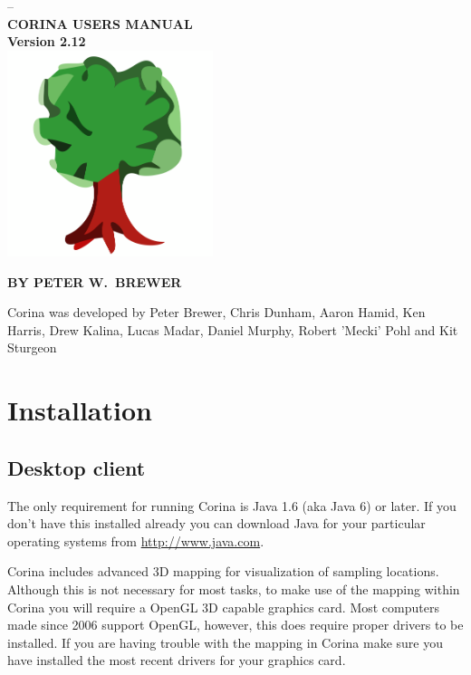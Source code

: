 \documentclass[10pt,letter, twopage headsepline]{book}
\begin{document}
\begin{titlepage}
{\centering --\\[4cm] \Huge \bfseries CORINA USERS MANUAL
\\[0.5cm]
\large{Version 2.12}
\\[2cm]
\includegraphics[width=6cm]{Images/logo.png}\\[1cm]
}

{\centering 
\normalsize
\textbf{BY PETER W.\ BREWER}\\[0.6cm]
}

\vfill

{\footnotesize
Corina was developed by Peter Brewer, Chris Dunham, Aaron Hamid, Ken Harris, Drew Kalina, Lucas Madar, Daniel Murphy, Robert 'Mecki' Pohl and Kit Sturgeon
}

\end{titlepage}
\tableofcontents

\chapter{Installation}


\section{Desktop client}



The only requirement for running Corina is Java 1.6 (aka Java 6) or later. If you don't have this installed already you can download Java for your particular operating systems from \url{http://www.java.com}.

Corina includes advanced 3D mapping for visualization of sampling locations. Although this is not necessary for most tasks, to make use of the mapping within Corina you will require a OpenGL 3D capable graphics card. Most computers made since 2006 support OpenGL, however, this does require proper drivers to be installed. If you are having trouble with the mapping in Corina make sure you have installed the most recent drivers for your graphics card.
\end{document}
